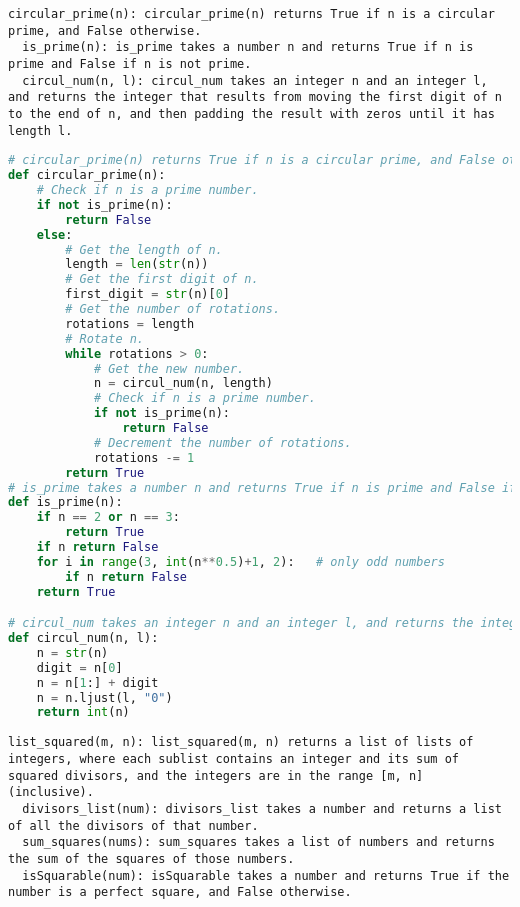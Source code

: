 \begin{figure*}
\begin{lstlisting}
circular_prime(n): circular_prime(n) returns True if n is a circular prime, and False otherwise.
  is_prime(n): is_prime takes a number n and returns True if n is prime and False if n is not prime.
  circul_num(n, l): circul_num takes an integer n and an integer l, and returns the integer that results from moving the first digit of n to the end of n, and then padding the result with zeros until it has length l.
\end{lstlisting}
\caption{Train Problem 3368, Solution 6}
\end{figure*}

\begin{figure*}
\begin{lstlisting}[language=Python]
# circular_prime(n) returns True if n is a circular prime, and False otherwise.
def circular_prime(n):
    # Check if n is a prime number.
    if not is_prime(n):
        return False
    else:
        # Get the length of n.
        length = len(str(n))
        # Get the first digit of n.
        first_digit = str(n)[0]
        # Get the number of rotations.
        rotations = length
        # Rotate n.
        while rotations > 0:
            # Get the new number.
            n = circul_num(n, length)
            # Check if n is a prime number.
            if not is_prime(n):
                return False
            # Decrement the number of rotations.
            rotations -= 1
        return True
# is_prime takes a number n and returns True if n is prime and False if n is not prime.
def is_prime(n):
    if n == 2 or n == 3:
        return True
    if n return False
    for i in range(3, int(n**0.5)+1, 2):   # only odd numbers
        if n return False
    return True

# circul_num takes an integer n and an integer l, and returns the integer that results from moving the first digit of n to the end of n, and then padding the result with zeros until it has length l.
def circul_num(n, l):
    n = str(n)
    digit = n[0]
    n = n[1:] + digit
    n = n.ljust(l, "0")
    return int(n)
\end{lstlisting}
\caption{Train Problem 3368, Solution 6}
\end{figure*}

\begin{figure*}
\begin{lstlisting}
list_squared(m, n): list_squared(m, n) returns a list of lists of integers, where each sublist contains an integer and its sum of squared divisors, and the integers are in the range [m, n] (inclusive).
  divisors_list(num): divisors_list takes a number and returns a list of all the divisors of that number.
  sum_squares(nums): sum_squares takes a list of numbers and returns the sum of the squares of those numbers.
  isSquarable(num): isSquarable takes a number and returns True if the number is a perfect square, and False otherwise.
\end{lstlisting}
\caption{Train Problem 3393, Solution 35}
\end{figure*}

